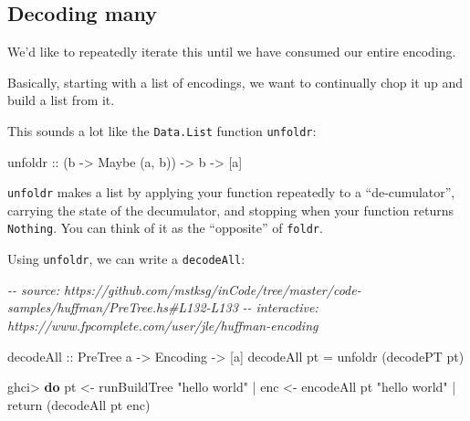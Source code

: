 \documentclass[]{article}
\newenvironment{Shaded}{}{}
\newcommand{\CommentTok}[1]{\textcolor[rgb]{0.38,0.63,0.69}{\textit{#1}}}
\newcommand{\DataTypeTok}[1]{\textcolor[rgb]{0.56,0.13,0.00}{#1}}
\newcommand{\FunctionTok}[1]{\textcolor[rgb]{0.02,0.16,0.49}{#1}}
\newcommand{\KeywordTok}[1]{\textcolor[rgb]{0.00,0.44,0.13}{\textbf{#1}}}
\newcommand{\NormalTok}[1]{#1}
\newcommand{\OperatorTok}[1]{\textcolor[rgb]{0.40,0.40,0.40}{#1}}
\newcommand{\OtherTok}[1]{\textcolor[rgb]{0.00,0.44,0.13}{#1}}
\newcommand{\StringTok}[1]{\textcolor[rgb]{0.25,0.44,0.63}{#1}}
\begin{document}
\subsection{Decoding many}\label{decoding-many}

We'd like to repeatedly iterate this until we have consumed our entire encoding.

Basically, starting with a list of encodings, we want to continually chop it up
and build a list from it.

This sounds a lot like the \texttt{Data.List} function \texttt{unfoldr}:

\begin{Shaded}
\begin{Highlighting}[]
\OtherTok{unfoldr ::}\NormalTok{ (b }\OtherTok{{-}\textgreater{}} \DataTypeTok{Maybe}\NormalTok{ (a, b)) }\OtherTok{{-}\textgreater{}}\NormalTok{ b }\OtherTok{{-}\textgreater{}}\NormalTok{ [a]}
\end{Highlighting}
\end{Shaded}

\texttt{unfoldr} makes a list by applying your function repeatedly to a
``de-cumulator'', carrying the state of the decumulator, and stopping when your
function returns \texttt{Nothing}. You can think of it as the ``opposite'' of
\texttt{foldr}.

Using \texttt{unfoldr}, we can write a \texttt{decodeAll}:

\begin{Shaded}
\begin{Highlighting}[]
\CommentTok{{-}{-} source: https://github.com/mstksg/inCode/tree/master/code{-}samples/huffman/PreTree.hs\#L132{-}L133}
\CommentTok{{-}{-} interactive: https://www.fpcomplete.com/user/jle/huffman{-}encoding}

\OtherTok{decodeAll ::} \DataTypeTok{PreTree}\NormalTok{ a }\OtherTok{{-}\textgreater{}} \DataTypeTok{Encoding} \OtherTok{{-}\textgreater{}}\NormalTok{ [a]}
\NormalTok{decodeAll pt }\OtherTok{=}\NormalTok{ unfoldr (decodePT pt)}
\end{Highlighting}
\end{Shaded}

\begin{Shaded}
\begin{Highlighting}[]
\NormalTok{ghci}\OperatorTok{\textgreater{}} \KeywordTok{do}\NormalTok{ pt  }\OtherTok{\textless{}{-}}\NormalTok{ runBuildTree }\StringTok{"hello world"}
 \OperatorTok{|}\NormalTok{    enc }\OtherTok{\textless{}{-}}\NormalTok{ encodeAll pt }\StringTok{"hello world"}
 \OperatorTok{|}    \FunctionTok{return}\NormalTok{ (decodeAll pt enc)}
\end{Highlighting}
\end{Shaded}
\end{document}
